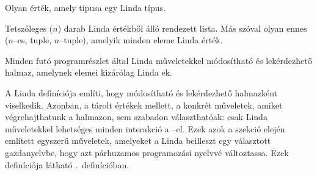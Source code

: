 \begin{defn}\label{def:linda-value}
    Olyan érték, amely típusa egy Linda típus.
\end{defn}

\begin{defn}\label{def:linda-tuple}
    Tetszőleges ($n$) darab Linda értékből álló rendezett lista.
    Más szóval olyan ennes ($n$--es, tuple, $n$--tuple), amelyik minden eleme Linda érték.
\end{defn}

\begin{defn}[A Linda \ts]
    Minden futó programrészlet által Linda műveletekkel módosítható és lekérdezhető halmaz, amelynek elemei kizárólag Linda \nes{}ek.
\end{defn}

A Linda \ts{} definíciója említi, hogy módosítható és lekérdezhető halmazként viselkedik.
Azonban, a tárolt értékek mellett, a konkrét műveletek, amiket végrehajthatunk a halmazon, sem szabadon választhatóak: csak Linda műveletekkel lehetséges minden interakció a \ts--el.
Ezek azok a szekció elején említett egyszerű műveletek, amelyeket a Linda beilleszt egy választott gazdanyelvbe, hogy azt párhuzamos programozási nyelvvé változtassa. Ezek definíciója látható .~definícióban.

